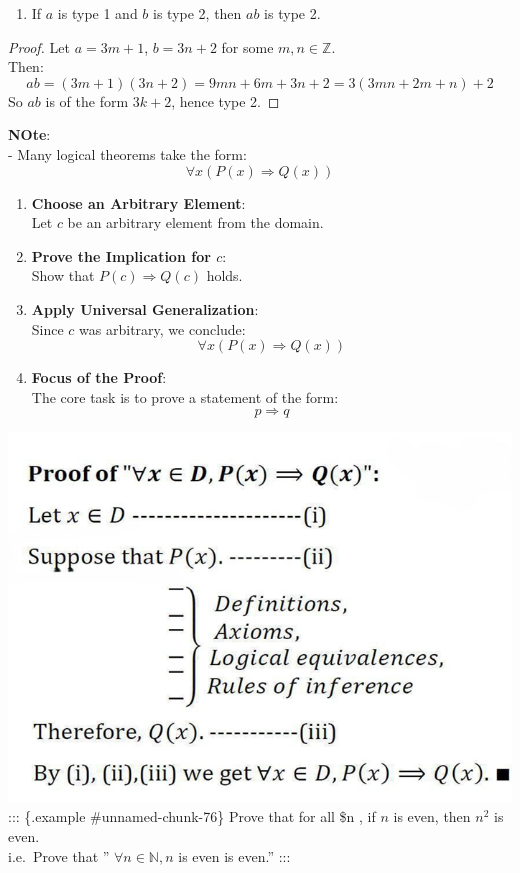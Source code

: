 \documentclass[
]{book}
\providecommand{\tightlist}{%
  \setlength{\itemsep}{0pt}\setlength{\parskip}{0pt}}
\theoremstyle{definition}
\theoremstyle{definition}
\theoremstyle{definition}
\theoremstyle{definition}
\theoremstyle{remark}
\begin{document}
\begin{enumerate}
\def\labelenumi{(\roman{enumi})}
\setcounter{enumi}{2}
\tightlist
\item
  If \(a\) is type 1 and \(b\) is type 2, then \(ab\) is type 2.
\end{enumerate}

\begin{proof}
Let \(a = 3m + 1\), \(b = 3n + 2\) for some \(m, n \in \mathbb{Z}\).\\
Then:
\[
ab = (3m + 1)(3n + 2) = 9mn + 6m + 3n + 2 = 3(3mn + 2m + n) + 2
\]
So \(ab\) is of the form \(3k + 2\), hence type 2.
\end{proof}

\textbf{NOte}:\\
- Many logical theorems take the form:\\
\[
  \forall x (P(x) \Rightarrow Q(x))
  \]

\begin{enumerate}
\def\labelenumi{\arabic{enumi}.}
\item
  \textbf{Choose an Arbitrary Element}:\\
  Let \(c\) be an arbitrary element from the domain.
\item
  \textbf{Prove the Implication for \(c\)}:\\
  Show that \(P(c) \Rightarrow Q(c)\) holds.
\item
  \textbf{Apply Universal Generalization}:\\
  Since \(c\) was arbitrary, we conclude:\\
  \[
  \forall x (P(x) \Rightarrow Q(x))
  \]
\item
  \textbf{Focus of the Proof}:\\
  The core task is to prove a statement of the form:\\
  \[
  p \Rightarrow q
  \]
\end{enumerate}

\includegraphics[width=0.6\linewidth,height=\textheight,keepaspectratio]{fig/fig4.png}
::: \{.example \#unnamed-chunk-76\}
Prove that for all \$n \in {} , if \(n\) is even, then \(n^2\) is even.\\
i.e.~Prove that '' \(\forall n \in  \mathbb{N}, n\) is even is even.''
:::
\end{document}
